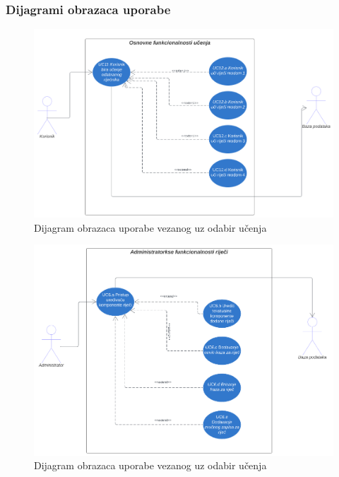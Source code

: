 				\subsubsection{Dijagrami obrazaca uporabe}
				\begin{figure}[H]
					\includegraphics[scale=0.5]{dijagrami/OsnovnaFunkcionalnost.png} 
					\centering
					\caption{Dijagram obrazaca uporabe vezanog uz odabir učenja} 
					\label{fig:class_diagram}
				\end{figure}
				\eject	
				\begin{figure}[H]
					\includegraphics[scale=0.5]{dijagrami/OsnovnaFunkcionalnostAdmina.png} 
					\centering
					\caption{Dijagram obrazaca uporabe vezanog uz odabir učenja} 
					\label{fig:class_diagram}
				\end{figure}
				\eject	
